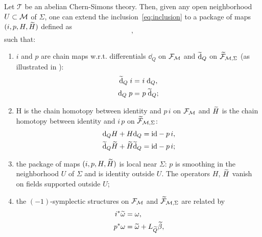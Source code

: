 \begin{theorem}
\label{theor:gluing}
    Let $\mathcal{T}$ be an abelian Chern-Simons theory.
    Then, given any open neighborhood $U \subset \mathcal{M}$ of $\Sigma$, one can extend the inclusion~\ref{eq:inclusion} to a package of maps $(i, p, H, \widetilde{H})$ defined as
    \begin{equation}
    \label{eq:theorem_maps}
        ,
    \end{equation}
    such that:
    \begin{enumerate}[label={\textup{\alph*)}}]
        \item \label{enum:theor_a} $i$ and $p$ are chain maps w.r.t. differentials $\dd_Q$ on $\mathcal{F}_{\mathcal{M}}$ and $\widetilde{\dd}_Q$ on $\widetilde{\mathcal{F}}_{\mathcal{M}, \Sigma}$ (as illustrated in ):
        \begin{equation}
        \label{eq:theor_a}
            \begin{aligned}
                \widetilde{\dd}_Q \; i =& \,\, i \; \dd_Q , \\
                \dd_Q \; p =& \,\, p \; \widetilde{\dd}_Q;
            \end{aligned}
        \end{equation}
        \item \label{enum:theor_b} H is the chain homotopy between identity and $p \, i$ on $\mathcal{F}_{\mathcal{M}}$ and $\widetilde{H}$ is the chain homotopy between identity and $i \, p$ on $\widetilde{\mathcal{F}}_{\mathcal{M}, \Sigma}$:
        \begin{equation}
        \label{eq:theo_b}
            \begin{aligned}
                \dd_Q H + H \dd_Q =&
                \; \text{id} - p \, i , \\
                \widetilde{\dd}_Q \widetilde{H} + \widetilde{H} \widetilde{\dd}_Q =&
                \; \text{id} - p \, i ;
            \end{aligned}
        \end{equation}
        \item \label{enum:theor_c} the package of maps $(i, p, H, \widetilde{H})$ is local near $\Sigma$:
        $p$ is smoothing in the neighborhood $U$ of $\Sigma$ and is identity outside $U$. The operators $H$, $\widetilde{H}$ vanish on fields supported outside $U$;
        \item \label{enum:theor_d} the $(-1)$-symplectic structures on $\mathcal{F}_{\mathcal{M}}$ and $\widetilde{\mathcal{F}}_{\mathcal{M}, \Sigma}$ are related by
        \begin{align}
        \label{eq:requ_lemma}
            i^* \wt{\omega} =& \; \omega , \\
            p^* \omega =& \; \wt{\omega} + L_{\wt{Q}} \wt{\beta} ,

\end{align}
\end{enumerate}
\end{theorem}
